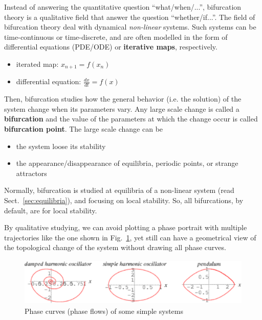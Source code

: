 Instead of answering the quantitative question ``what/when/...'',
bifurcation theory is a qualitative field that answer the question
``whether/if...''.  The field of bifurcation theory deal with
dynamical {\it non-linear} systems. Such systems can be
time-continuous or time-discrete, and are often modelled in the form
of differential equations (PDE/ODE) or {\bf iterative maps},
respectively.
\begin{itemize}
\item iterated map: $x_{n+1}=f(x_n)$
\item differential equation: $\frac{dx}{dt} = f(x)$
\end{itemize}
Then, bifurcation studies how the general behavior (i.e. the solution)
of the system change when its parameters vary. Any large scale change
is called a {\bf bifurcation} and the value of the parameters at which
the change occur is called {\bf bifurcation point}. The large scale
change can be
\begin{itemize}
\item the system loose its stability
\item the appearance/disappearance of equilibria, periodic points, or
  strange attractors
\end{itemize}
Normally, bifurcation is studied at equilibria of a non-linear system
(read Sect.~\ref{sec:equilibria}), and focusing on local
stability. So, all bifurcations, by default, are for local stability. 

By qualitative studying, we can avoid plotting a phase portrait with
multiple trajectories like the one shown in
Fig.~\ref{fig:phase_curve}, yet still can have a geometrical view of
the topological change of the system without drawing all phase curves.


\begin{figure}[htb]
  \centerline{\includegraphics[height=2.3cm]{./images/phase_curve.eps}}
  \caption{Phase curves (phase flows) of some simple
    systems}\label{fig:phase_curve}
\end{figure}



